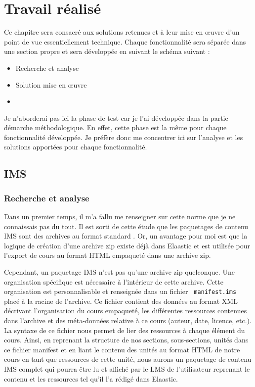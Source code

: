 \chapter{Travail réalisé}
Ce chapitre sera consacré aux solutions retenues et à leur mise en \oe uvre d'un
point de vue essentiellement technique. Chaque fonctionnalité sera séparée dans
une section propre et sera développée en suivant le schéma suivant :
\begin{itemize}
  \item Recherche et analyse
  \item Solution mise en \oe uvre
  \item 
\end{itemize}

Je n'aborderai pas ici la phase de test car je l'ai développée dans la partie
démarche méthodologique. En effet, cette phase est la même pour chaque
fonctionnalité développée. Je préfère donc me concentrer ici sur l'analyse et
les solutions apportées pour chaque fonctionnalité. %
\section{IMS}
\subsection{Recherche et analyse}
Dans un premier temps, il m'a fallu me renseigner sur cette norme que je ne
connaissais pas du tout. Il est sorti de cette étude que les paquetages de
contenu IMS sont des archives au format standard . Or, un avantage
pour moi est que la logique de création d'une archive zip existe déjà dans
Elaastic et est utilisée pour l'export de cours au format HTML empaqueté dans
une archive zip.

Cependant, un paquetage IMS n'est pas qu'une archive zip quelconque. Une
organisation spécifique est nécessaire à l'intérieur de cette archive. Cette
organisation est personnalisable et renseignée dans un fichier {\tt
manifest.ims} placé à la racine de l'archive. Ce fichier contient des données au
format XML décrivant l'organisation du cours empaqueté, les différentes
ressources contenues dans l'archive et des méta-données relative à ce cours
(auteur, date, licence, etc.). La syntaxe de ce fichier nous permet de lier des
ressources à chaque élément du cours.
Ainsi, en reprenant la structure de nos sections, sous-sections, unités dans ce
fichier manifest et en liant le contenu des unités au format HTML de notre cours
en tant que ressources de cette unité, nous aurons un paquetage de contenu IMS
complet qui pourra être lu et affiché par le LMS de l'utilisateur reprenant le
contenu et les ressources tel qu'il l'a rédigé dans Elaastic.

